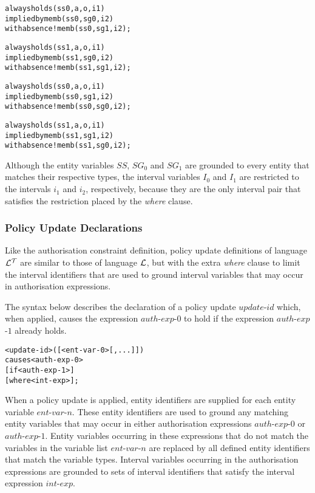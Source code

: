 \documentclass[11pt]{report}
\newenvironment{vverbatim}
{
  \begin{alltt}
}
{
  \vspace{-\baselineskip}
  \end{alltt}
}
\begin{document}
          \begin{vverbatim}
  always holds(ss0, a, o, i1)
    implied by memb(ss0, sg0, i2)
    with absence !memb(ss0, sg1, i2);

  always holds(ss1, a, o, i1)
    implied by memb(ss1, sg0, i2)
    with absence !memb(ss1, sg1, i2);

  always holds(ss0, a, o, i1)
    implied by memb(ss0, sg1, i2)
    with absence !memb(ss0, sg0, i2);

  always holds(ss1, a, o, i1)
    implied by memb(ss1, sg1, i2)
    with absence !memb(ss1, sg0, i2);
          \end{vverbatim}

          Although the entity variables $SS$, $SG_0$ and $SG_1$ are grounded
          to every entity that matches their respective types, the interval
          variables $I_0$ and $I_1$ are restricted to the intervals $i_1$ and
          $i_2$, respectively, because they are the only interval pair that
          satisfies the restriction placed by the {\em where} clause.
        
        \subsubsection{Policy Update Declarations}

          Like the authorisation constraint definition, policy update
          definitions of language ${\cal L^T}$ are similar to those of language
          ${\cal L}$, but with the extra {\em where} clause to limit the
          interval identifiers that are used to ground interval variables that
          may occur in authorisation expressions.

          The syntax below describes the declaration of a policy update
          $update$-$id$ which, when applied, causes the expression
          $auth$-$exp$-$0$ to hold if the expression $auth$-$exp$-$1$ already
          holds.

          \begin{vverbatim}
  <update-id>([<ent-var-0>[, ...]])
    causes <auth-exp-0>
    [if <auth-exp-1>]
    [where <int-exp>];
          \end{vverbatim}

          When a policy update is applied, entity identifiers are supplied for
          each entity variable $ent$-$var$-$n$. These entity identifiers are
          used to ground any matching entity variables that may occur in either
          authorisation expressions $auth$-$exp$-$0$ or $auth$-$exp$-$1$.
          Entity variables occurring in these expressions that do not match
          the variables in the variable list $ent$-$var$-$n$ are replaced by
          all defined entity identifiers that match the variable types.
          Interval variables occurring in the authorisation expressions are
          grounded to sets of interval identifiers that satisfy the interval
          expression $int$-$exp$.
\end{document}
